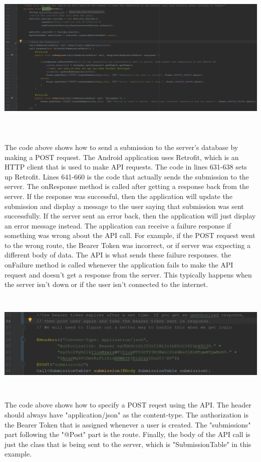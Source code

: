 \documentclass[onecolumn, draftclsnofoot,10pt, compsoc]{IEEEtran}
\begin{document}
 \begin{center}
\includegraphics[height=8cm]{sendtoserverfunction.png}
\end{center}
The code above shows how to send a submission to the server's database by making a POST request. The Android application uses Retrofit, which is an HTTP client that is used to make API requests. The code in lines 631-638 sets up Retrofit. Lines 641-660 is the code that actually sends the submission to the server. The onResponse method is called after getting a response back from the server. If the response was successful, then the application will update the submission and display a message to the user saying that submission was sent successfully. If the server sent an error back, then the application will just display an error message instead. The application can receive a failure response if something was wrong about the API call. For example, if the POST request went to the wrong route, the Bearer Token was incorrect, or if server was expecting a different body of data. The API is what sends these failure responses. the onFailure method is called whenever the application fails to make the API request and doesn't get a response from the server. This typically happens when the server isn't down or if the user isn't connected to the internet.

\begin{center}
\includegraphics[height=5cm, width=18cm]{api_call_fixed.png}
\end{center}
The code above shows how to specify a POST reqest using the API. The header should always have "application/json" as the content-type. The authorization is the Bearer Token that is assigned whenever a user is created. The "submissions" part following the "@Post" part is the route. Finally, the body of the API call is just the class that is being sent to the server, which is "SubmissionTable" in this example.
\end{document}
